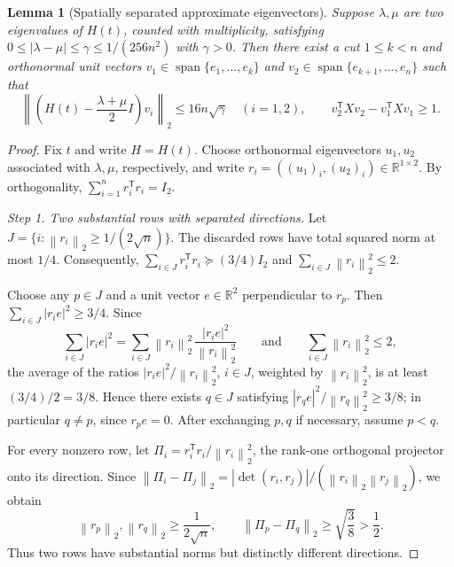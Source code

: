 \documentclass[10pt,a4paper]{article}
\newtheorem{lemma}{Lemma}[section]
\newcommand{\norm}[1]{\left\lVert #1\right\rVert}
\DeclareMathOperator{\spn}{span}
\newcommand{\R}{\mathbb R}
\begin{document}
\begin{lemma}[Spatially separated approximate eigenvectors]
\label{lem:localization}
Suppose $\lambda,\mu$ are two eigenvalues of $H(t)$, counted with
multiplicity, satisfying $0\leq|\lambda-\mu|\leq\gamma\leq
1/(256n^2)$ with $\gamma>0$. Then there exist a cut $1\leq k<n$
and orthonormal unit vectors
$v_1\in\spn\{e_1,\ldots,e_k\}$ and
$v_2\in\spn\{e_{k+1},\ldots,e_n\}$ such that
\begin{equation}\label{eq:quasi}
\boxed{
\left\lVert\left(H(t)-\frac{\lambda+\mu}{2}I\right)v_i
\right\rVert_2\leq16n\sqrt\gamma\quad(i=1,2),
\qquad v_2^{\mathsf T}Xv_2-v_1^{\mathsf T}Xv_1\geq1.
}
\end{equation}
\end{lemma}

\begin{proof}
Fix $t$ and write $H=H(t)$. Choose orthonormal eigenvectors
$u_1,u_2$ associated with $\lambda,\mu$, respectively, and
write $r_i=((u_1)_i,(u_2)_i)\in\R^{1\times2}$.
By orthogonality, $\sum_{i=1}^n r_i^{\mathsf T}r_i=I_2$.

\emph{Step 1. Two substantial rows with separated directions.}
Let $J=\{i:\norm{r_i}_2\geq1/(2\sqrt n)\}$.
The discarded rows have total squared norm at most $1/4$.
Consequently,
$\sum_{i\in J}r_i^{\mathsf T}r_i\succeq(3/4)I_2$
and $\sum_{i\in J}\norm{r_i}_2^2\leq2$.

Choose any $p\in J$ and a unit vector $e\in\R^2$
perpendicular to $r_p$. Then
$\sum_{i\in J}|r_ie|^2\geq3/4$. Since
\[
\sum_{i\in J}|r_ie|^2
=\sum_{i\in J}\norm{r_i}_2^2\,
\frac{|r_ie|^2}{\norm{r_i}_2^2}
\qquad\text{and}\qquad
\sum_{i\in J}\norm{r_i}_2^2\leq2,
\]
the average of the ratios $|r_ie|^2/\norm{r_i}_2^2$,
$i\in J$, weighted by $\norm{r_i}_2^2$, is at least
$(3/4)/2=3/8$. Hence there exists $q\in J$ satisfying
$|r_qe|^2/\norm{r_q}_2^2\geq3/8$; in particular
$q\neq p$, since $r_pe=0$.
After exchanging $p,q$ if necessary, assume $p<q$.

For every nonzero row, let
$\Pi_i=r_i^{\mathsf T}r_i/\norm{r_i}_2^2$,
the rank-one orthogonal projector onto its direction.
Since
$\norm{\Pi_i-\Pi_j}_2
=|\det(r_i,r_j)|/(\norm{r_i}_2\norm{r_j}_2)$,
we obtain
\begin{equation}\label{eq:endpoints}
\boxed{
\norm{r_p}_2,\norm{r_q}_2\geq\frac1{2\sqrt n},
\qquad
\norm{\Pi_p-\Pi_q}_2\geq\sqrt{\frac38}>\frac12.
}
\end{equation}
Thus two rows have substantial norms but distinctly
different directions.


\end{proof}
\end{document}
